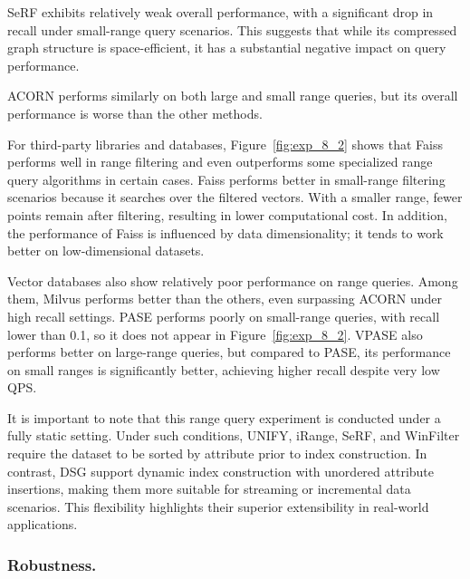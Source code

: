 \documentclass[sigconf, nonacm]{acmart}
\begin{document}
	SeRF exhibits relatively weak overall performance, with a significant drop in recall under small-range query scenarios. This suggests that while its compressed graph structure is space-efficient, it has a substantial negative impact on query performance.
	
	ACORN performs similarly on both large and small range queries, but its overall performance is worse than the other methods.
	
	For third-party libraries and databases, Figure~\ref{fig:exp_8_2} shows that Faiss performs well in range filtering and even outperforms some specialized range query algorithms in certain cases. Faiss performs better in small-range filtering scenarios because it searches over the filtered vectors. With a smaller range, fewer points remain after filtering, resulting in lower computational cost. In addition, the performance of Faiss is influenced by data dimensionality; it tends to work better on low-dimensional datasets.
	
	Vector databases also show relatively poor performance on range queries. Among them, Milvus performs better than the others, even surpassing ACORN under high recall settings. PASE performs poorly on small-range queries, with recall lower than 0.1, so it does not appear in Figure~\ref{fig:exp_8_2}. VPASE also performs better on large-range queries, but compared to PASE, its performance on small ranges is significantly better, achieving higher recall despite very low QPS.

	
	
	
	It is important to note that this range query experiment is conducted under a fully static setting. Under such conditions, UNIFY, iRange, SeRF, and WinFilter require the dataset to be sorted by attribute prior to index construction. In contrast, DSG  support dynamic index construction with unordered attribute insertions, making them more suitable for streaming or incremental data scenarios. This flexibility highlights their superior extensibility in real-world applications.
	\subsubsection{Robustness.}
	
\end{document}
